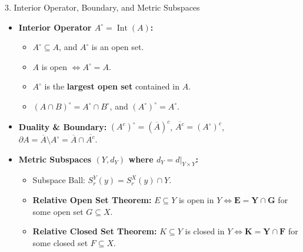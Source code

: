 \documentclass[11pt,a4paper]{article}
\begin{document}
\begin{formulabox}{3. Interior Operator, Boundary, and Metric Subspaces}
\begin{itemize}
    \item \textbf{Interior Operator $A^\circ = \operatorname{Int}(A)$:}
    \begin{itemize}
        \item $A^\circ \subseteq A$, and $A^\circ$ is an open set.
        \item $A$ is open $\iff A^\circ = A$.
        \item $A^\circ$ is the \textbf{largest open set} contained in $A$.
        \item $(A \cap B)^\circ = A^\circ \cap B^\circ$, and $(A^\circ)^\circ = A^\circ$.
    \end{itemize}
    \item \textbf{Duality \& Boundary:} $(A^c)^\circ = (\overline{A})^c$, $\overline{A^c} = (A^\circ)^c$, $\partial A = \overline{A} \setminus A^\circ = \overline{A} \cap \overline{A^c}$.
    \item \textbf{Metric Subspaces $(Y, d_Y)$ where $d_Y = d|_{Y \times Y}$:}
    \begin{itemize}
        \item Subspace Ball: $S_r^Y(y) = S_r^X(y) \cap Y$.
        \item \textbf{Relative Open Set Theorem:} $E \subseteq Y$ is open in $Y \iff \mathbf{E = Y \cap G}$ for some open set $G \subseteq X$.
        \item \textbf{Relative Closed Set Theorem:} $K \subseteq Y$ is closed in $Y \iff \mathbf{K = Y \cap F}$ for some closed set $F \subseteq X$.
    \end{itemize}
\end{itemize}
\end{formulabox}
\end{document}
